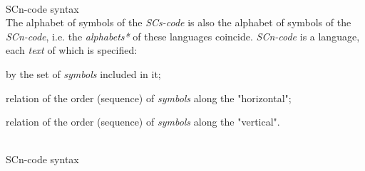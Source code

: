 \begin{frame}{\\SCn-code syntax}
	\topline
	\justifying
	\vspace*{\fill}\\
	The alphabet of symbols of the \textit{SCs-code} is also the alphabet of symbols of the \textit{SCn-code}, i.e. the \textit{alphabets*} of these languages coincide.
	\textit{SCn-code} is a language, each \textit{text} of which is specified:
	\begin{textitemize}
		\item by the set of \textit{symbols} included in it;
		\item relation of the order (sequence) of \textit{symbols} along the "horizontal";
		\item relation of the order (sequence) of \textit{symbols} along the "vertical"{}.
	\end{textitemize}
\end{frame}

\begin{frame}{\\SCn-code syntax}
	\topline
	\justifying
	\small{
		\begin{SCn}
			
			
		\end{SCn}
	}
\end{frame}

